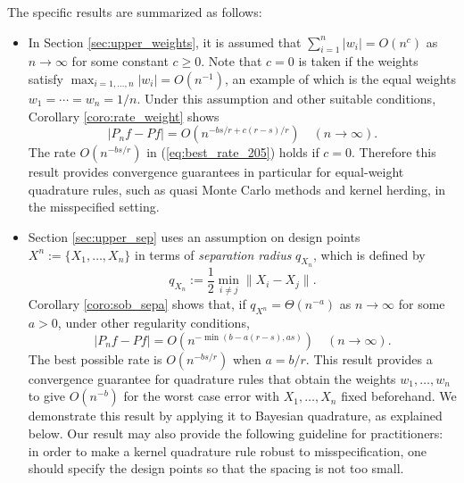 \documentclass[11pt]{article}
\theoremstyle{remark}
\theoremstyle{example}
\theoremstyle{remark}
\begin{document}
The specific results are summarized as follows:\vspace{-2mm}
\begin{itemize}
\item
In Section \ref{sec:upper_weights}, it is assumed that $\sum_{i=1}^n | w_i | = O(n^{c})$ as $n \to \infty$ for some constant $c \geq 0$.
Note that $c = 0$ is taken if the weights satisfy $\max_{i=1,\dots,n} |w_i| = O(n^{-1})$, an example of which is the equal weights $w_1 = \cdots =w_n = 1/n$. Under this assumption and other suitable conditions, Corollary \ref{coro:rate_weight} shows 
\begin{equation*} 
| P_n f - P f | = O( n^{ - bs/r + c (r-s)/r  } ) \quad (n \to \infty).
\end{equation*}
The rate $O(n^{-bs/r})$ in (\ref{eq:best_rate_205}) holds if $c = 0$.
Therefore this result provides convergence guarantees in particular for equal-weight quadrature rules, such as quasi Monte Carlo methods and kernel herding, in the misspecified setting.\vspace{-1mm}

\item
Section \ref{sec:upper_sep} uses an assumption on design points $X^n := \{X_1,\dots,X_n\}$ in terms of {\em separation radius} $q_{X_n}$, which is defined by 
\begin{equation}\label{eq:separation_radius}
q_{X_n} := \frac{1}{2} \min_{i \neq j} \| X_i - X_j \| .
\end{equation}
Corollary \ref{coro:sob_sepa} shows that, if $q_{X^n} = \Theta(n^{-a})$ as $n \to \infty$ for some $a > 0$, under other regularity conditions, 
\begin{equation} 
| P_n f - P f | = O(n^{- \min( b - a(r-s), as)} ) \quad (n \to \infty).
\end{equation}
The best possible rate is $O(n^{-bs/r})$ when $a = b/r$.
This result provides a convergence guarantee for quadrature rules that obtain the weights $w_1,\dots,w_n$ to give $O(n^{-b})$ for the worst case error with $X_1,\dots,X_n$ fixed beforehand. We demonstrate this result by applying it to Bayesian quadrature, as explained below.
Our result may also provide the following guideline for practitioners: in order to make a kernel quadrature rule robust to misspecification, one should specify the design points so that the spacing is not too small. \vspace{-1mm} 


\end{itemize}
\end{document}
